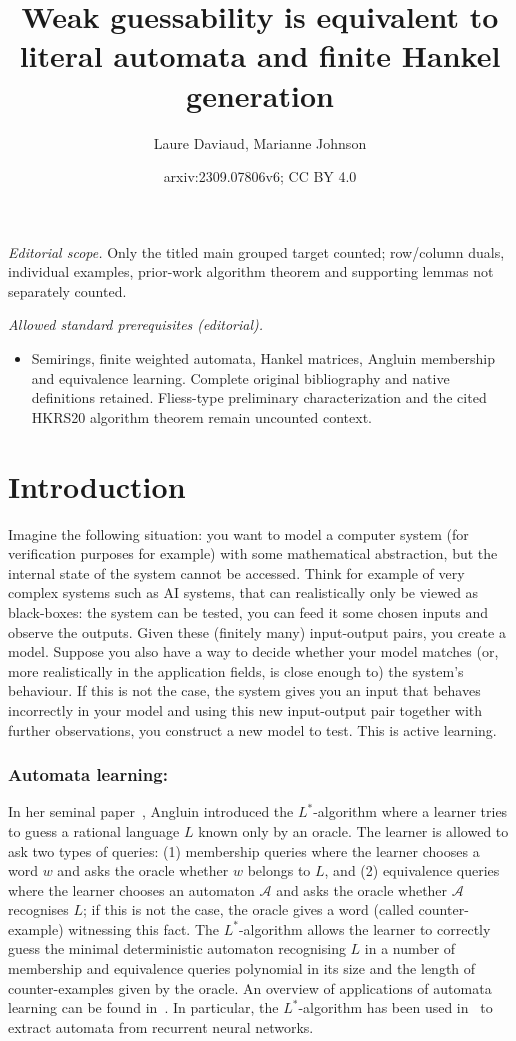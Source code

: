 \documentclass[10pt,a4paper]{amsart}
\title{Weak guessability is equivalent to literal automata and finite Hankel generation}
\author{Laure Daviaud, Marianne Johnson}
\date{arxiv:2309.07806v6; CC BY 4.0}
\theoremstyle{definition}
\numberwithin{equation}{section}
\numberwithin{theorem}{section}
\begin{document}
\maketitle
\noindent\textit{Editorial scope.} Only the titled main grouped target counted; row/column duals, individual examples, prior-work algorithm theorem and supporting lemmas not separately counted.\par\medskip
\noindent\textit{Allowed standard prerequisites (editorial).}\begin{itemize}
\item Semirings, finite weighted automata, Hankel matrices, Angluin membership and equivalence learning. Complete original bibliography and native definitions retained. Fliess-type preliminary characterization and the cited HKRS20 algorithm theorem remain uncounted context.
\end{itemize}\medskip
\section{Introduction}\label{section:intro}
Imagine the following situation: you want to model a computer system (for verification purposes for example) with some mathematical abstraction, but the internal state of the system cannot be accessed. Think for example of very complex systems such as AI systems, that can realistically only be viewed as black-boxes: the system can be tested, you can feed it some chosen inputs and observe the outputs. Given these (finitely many)  input-output pairs, you create a model. Suppose you also have a way to decide whether your model matches (or, more realistically in the application fields, is close enough to) the system's behaviour. If this is not the case, the system gives you an input that behaves incorrectly in your model and using this new input-output pair together with further observations, you construct a new model to test. This is active learning.   

\subsubsection*{\textbf{Automata learning:}} In her seminal paper~\cite{A87}, Angluin introduced the $L^*$-algorithm where a learner tries to guess a rational language $L$ known only by an oracle. The learner is allowed to ask two types of queries: (1) membership queries where the learner chooses a word $w$ and asks the oracle whether $w$ belongs to $L$, and (2) equivalence queries where the learner chooses an automaton $\mathcal{A}$ and asks the oracle whether $\mathcal{A}$ recognises $L$; if this is not the case, the oracle gives a word (called counter-example) witnessing this fact. The $L^*$-algorithm allows the learner to correctly guess  the minimal deterministic automaton recognising $L$ in a  number of membership and equivalence queries polynomial in its size and the length of counter-examples given by the oracle. An overview of applications of automata learning can be found in~\cite{L06,HS16,V17}. In particular, the $L^*$-algorithm has been used in~\cite{WGY18} to extract automata from recurrent neural networks.
\end{document}
